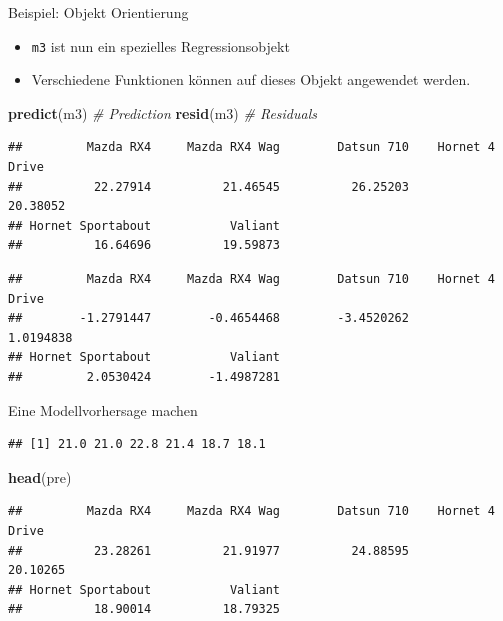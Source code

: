 \documentclass[ignorenonframetext,]{beamer}
\newenvironment{Shaded}{\begin{snugshade}}{\end{snugshade}}
\newcommand{\KeywordTok}[1]{\textcolor[rgb]{0.13,0.29,0.53}{\textbf{#1}}}
\newcommand{\StringTok}[1]{\textcolor[rgb]{0.31,0.60,0.02}{#1}}
\newcommand{\CommentTok}[1]{\textcolor[rgb]{0.56,0.35,0.01}{\textit{#1}}}
\newcommand{\OperatorTok}[1]{\textcolor[rgb]{0.81,0.36,0.00}{\textbf{#1}}}
\newcommand{\NormalTok}[1]{#1}
\providecommand{\tightlist}{%
  \setlength{\itemsep}{0pt}\setlength{\parskip}{0pt}}
\begin{document}
\begin{frame}[fragile]{Beispiel: Objekt Orientierung}

\begin{itemize}
\tightlist
\item
  \texttt{m3} ist nun ein spezielles Regressionsobjekt
\item
  Verschiedene Funktionen können auf dieses Objekt angewendet werden.
\end{itemize}

\begin{Shaded}
\begin{Highlighting}[]
\KeywordTok{predict}\NormalTok{(m3) }\CommentTok{# Prediction}
\KeywordTok{resid}\NormalTok{(m3) }\CommentTok{# Residuals}
\end{Highlighting}
\end{Shaded}

\begin{verbatim}
##         Mazda RX4     Mazda RX4 Wag        Datsun 710    Hornet 4 Drive 
##          22.27914          21.46545          26.25203          20.38052 
## Hornet Sportabout           Valiant 
##          16.64696          19.59873
\end{verbatim}

\begin{verbatim}
##         Mazda RX4     Mazda RX4 Wag        Datsun 710    Hornet 4 Drive 
##        -1.2791447        -0.4654468        -3.4520262         1.0194838 
## Hornet Sportabout           Valiant 
##         2.0530424        -1.4987281
\end{verbatim}

\end{frame}

\begin{frame}[fragile]{Eine Modellvorhersage machen}

\begin{Shaded}
\end{Shaded}

\begin{verbatim}
## [1] 21.0 21.0 22.8 21.4 18.7 18.1
\end{verbatim}

\begin{Shaded}
\begin{Highlighting}[]
\KeywordTok{head}\NormalTok{(pre)}
\end{Highlighting}
\end{Shaded}

\begin{verbatim}
##         Mazda RX4     Mazda RX4 Wag        Datsun 710    Hornet 4 Drive 
##          23.28261          21.91977          24.88595          20.10265 
## Hornet Sportabout           Valiant 
##          18.90014          18.79325
\end{verbatim}

\end{frame}
\end{document}
